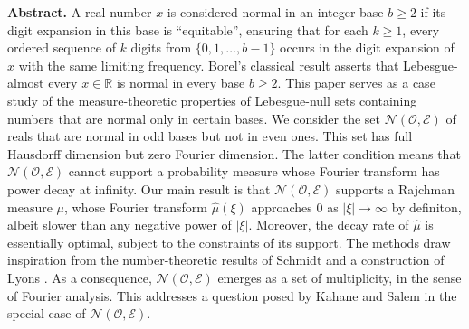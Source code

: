 \documentclass[12pt, twoside]{article}
\def\nn{{\mathbb N}}
\def\st{\subset}
\theoremstyle{definition}
\numberwithin{equation}{section}
\begin{document}
\begin{center}
\begin{minipage}{13cm}
{\small {\bf Abstract.} A real number $x$ is considered normal in an integer base $b \geq 2$ if its digit expansion in this base is ``equitable'', ensuring that for each $k \geq 1$, every ordered sequence of $k$ digits from $\{0, 1, \ldots, b-1\}$ occurs in the digit expansion of $x$ with the same limiting frequency. Borel's classical result \cite{b09} asserts that Lebesgue-almost every $x \in \mathbb R$ is normal in every base $b \geq 2$. 
\vskip0.1in 
\noindent This paper serves as a case study of the measure-theoretic properties of Lebesgue-null sets containing numbers that are normal only in certain bases.  We consider the set $\mathscr N(\mathscr{O}, \mathscr{E})$ of reals that are normal in odd bases but not in even ones. This set has full Hausdorff dimension \cite{p81} but zero Fourier dimension. The latter condition means that $\mathscr N(\mathscr{O}, \mathscr{E})$ cannot support a probability measure whose Fourier transform has power decay at infinity. Our main result is that $\mathscr N(\mathscr{O}, \mathscr{E})$ supports a Rajchman measure $\mu$, whose Fourier transform $\widehat{\mu}(\xi)$ approaches 0 as $|\xi| \rightarrow \infty$ by definiton, albeit slower than any negative power of $|\xi|$. Moreover, the decay rate of $\widehat{\mu}$ is essentially optimal, subject to the constraints of its support. The methods draw inspiration from the number-theoretic results of Schmidt \cite{s60} and a construction of Lyons \cite{l86}.
\vskip0.1in
\noindent  As a consequence, $\mathscr N(\mathscr{O}, \mathscr{E})$ emerges as a set of multiplicity, in the sense of Fourier analysis. This addresses a question posed by Kahane and Salem \cite{Kahane-Salem-64} in the special case of $\mathscr N(\mathscr{O}, \mathscr{E})$.
}    
%
\end{minipage}
\end{center}

\tableofcontents
\end{document}
